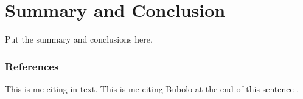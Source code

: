 \documentclass{aastex631}
\begin{document}
\section{Summary and Conclusion} \label{sec:summary}
Put the summary and conclusions here.


\subsubsection{References}
This is me citing \citet{boeing} in-text. This is me citing Bubolo at the end of this sentence \citep{bubolo}.

\newpage

%

\end{document}
